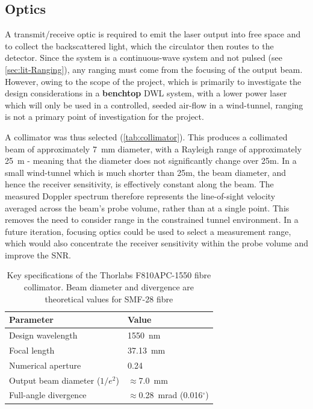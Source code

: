 \subsection{Optics}
 A transmit/receive optic is required to emit the laser output into free space and to collect the backscattered light, which the circulator then routes to the detector. Since the system is a continuous-wave system and not pulsed (see \autoref{sec:lit-Ranging}), any ranging must come from the focusing of the output beam. However, owing to the scope of the project, which is primarily to investigate the design considerations in a \textbf{benchtop} DWL system, with a lower power laser which will only be used in a controlled, seeded air-flow in a wind-tunnel, ranging is not a primary point of investigation for the project. 
 
 A collimator was thus selected (\autoref{tab:collimator}). This produces a
 collimated beam of approximately 7~mm diameter, with a Rayleigh range of
 approximately 25~m - meaning that the diameter does not significantly change over 25m. In a small wind-tunnel which is much shorter than 25m, the beam diameter, and hence the
 receiver sensitivity, is effectively constant along the beam. The measured
 Doppler spectrum therefore represents the line-of-sight velocity averaged across the beam's probe volume, rather than at a single point. This removes the need to consider range in the constrained tunnel
 environment. In a future iteration, focusing optics could be used to select a
 measurement range, which would also concentrate the receiver sensitivity within
 the probe volume and improve the SNR.
 
 \begin{table}[H]
 	\centering
 	
 	\begin{tabular}{@{}ll@{}}
 		\toprule
 		\textbf{Parameter} & \textbf{Value} \\
 		\midrule
 		Design wavelength              & 1550~nm \\
 		Focal length                   & 37.13~mm \\
 		Numerical aperture             & 0.24 \\
 		Output beam diameter ($1/e^2$) & $\approx$7.0~mm \\
 		Full-angle divergence          & $\approx$0.28~mrad (0.016$^\circ$) \\
 		\bottomrule
 	\end{tabular}
 	\caption{Key specifications of the Thorlabs F810APC-1550 fibre collimator. Beam diameter and divergence are theoretical values for SMF-28 fibre}
 	\label{tab:collimator}
 \end{table}
 
